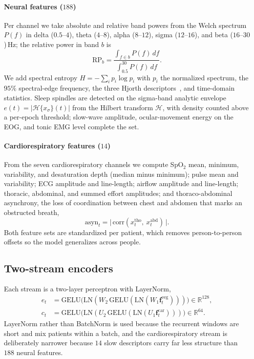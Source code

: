 \documentclass[journal]{IEEEtran}
\begin{document}
\paragraph{Neural features ($188$)}
Per channel we take absolute and relative band powers from the Welch spectrum $P(f)$ in delta
($0.5$--$4$), theta ($4$--$8$), alpha ($8$--$12$), sigma ($12$--$16$), and beta
($16$--$30$)\,Hz; the relative power in band $b$ is
\begin{equation}
\mathrm{RP}_b=\frac{\int_{f\in b}P(f)\,df}{\int_{0.5}^{30}P(f)\,df}.
\end{equation}
We add spectral entropy $H=-\sum_i p_i\log p_i$ with $p_i$ the normalized spectrum, the
$95\%$ spectral-edge frequency, the three Hjorth descriptors~\cite{hjorth1970eeg}, and
time-domain statistics. Sleep spindles are detected on the sigma-band analytic envelope
$e(t)=\lvert\mathcal{H}\{x_\sigma\}(t)\rvert$ from the Hilbert transform $\mathcal{H}$, with
density counted above a per-epoch threshold; slow-wave amplitude, ocular-movement energy on
the EOG, and tonic EMG level complete the set.

\paragraph{Cardiorespiratory features ($14$)}
From the seven cardiorespiratory channels we compute SpO$_2$ mean, minimum, variability, and
desaturation depth (median minus minimum); pulse mean and variability; ECG amplitude and
line-length; airflow amplitude and line-length; thoracic, abdominal, and summed effort
amplitudes; and thoraco-abdominal asynchrony, the loss of coordination between chest and
abdomen that marks an obstructed breath,
\begin{equation}
\mathrm{asyn}_t=\big\lvert\,\mathrm{corr}(x^{\mathrm{tho}}_t,\ x^{\mathrm{abd}}_t)\,\big\rvert .
\end{equation}
Both feature sets are standardized per patient, which removes person-to-person offsets so the
model generalizes across people.

\subsection{Two-stream encoders}
Each stream is a two-layer perceptron with LayerNorm,
\begin{align}
e_t&=\mathrm{GELU}\!\big(\mathrm{LN}(W_2\,\mathrm{GELU}(\mathrm{LN}(W_1\mathbf{f}^{\mathrm{eeg}}_t))) \big)\in\mathbb{R}^{128},\\
c_t&=\mathrm{GELU}\!\big(\mathrm{LN}(U_2\,\mathrm{GELU}(\mathrm{LN}(U_1\mathbf{f}^{\mathrm{car}}_t))) \big)\in\mathbb{R}^{64}.
\end{align}
LayerNorm rather than BatchNorm is used because the recurrent windows are short and mix
patients within a batch, and the cardiorespiratory stream is deliberately narrower because
$14$ slow descriptors carry far less structure than $188$ neural features.
\end{document}
